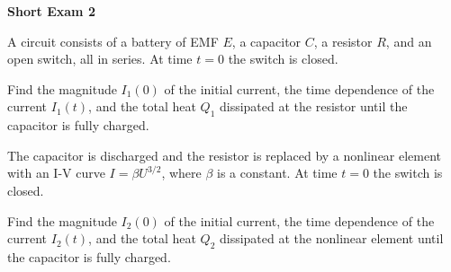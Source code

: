 \documentclass[../TST.tex]{subfiles}
\begin{document}
\begin{large}
	\textbf{Short Exam 2}
\end{large}

\begin{sproblem}
A circuit consists of a battery of EMF $E$, a capacitor $C$, a resistor $R$, and an open switch, all in series. At time $t=0$ the switch is closed.
\begin{subpart}
	\item Find the magnitude $I_1(0)$ of the initial current, the time dependence of the current $I_1(t)$, and the total heat $Q_1$ dissipated at the resistor until the capacitor is fully charged. \hphantom{..............} \hfill {}
\end{subpart}
The capacitor is discharged and the resistor is replaced by a nonlinear element with an I-V curve $I=\beta U^{3/2}$, where $\beta$ is a constant. At time $t=0$ the switch is closed.
\begin{subpart}[resume]
	\item Find the magnitude $I_2(0)$ of the initial current, the time dependence of the current $I_2(t)$, and the total heat $Q_2$ dissipated at the nonlinear element until the capacitor is fully charged. 
\end{subpart}
\end{sproblem}
\end{document}
